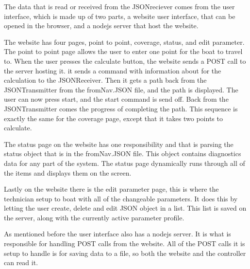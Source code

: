 The data that is read or received from the JSONreciever comes from the user interface, which is made up of two parts, a website user interface, that can be opened in the browser, and a nodejs server that host the website. 

The website has four pages, point to point, coverage, status, and edit parameter. The point to point page allows the user to enter one point for the boat to travel to. When the user presses the calculate button, the website sends a POST call to the server hosting it. it sends a command with information about for the calculation to the JSONReceiver. Then it gets a path back from the JSONTransmitter from the fromNav.JSON file, and the path is displayed. The user can now press start, and the start command is send off. Back from the JSONTransmitter comes the progress of completing the path. This sequence is exactly the same for the coverage page, except that it takes two points to calculate. 

The status page on the website has one responsibility and that is parsing the status object that is in the fromNav.JSON file. This object contains diagnostics data for any part of the system. The status page dynamically runs through all of the items and displays them on the screen.

Lastly on the website there is the edit parameter page, this is where the technician setup to boat with all of the changeable parameters. It does this by letting the user create, delete and edit JSON object in a list. This list is saved on the server, along with the currently active parameter profile. 

As mentioned before the user interface also has a nodejs server\cite{nodejs}. It is what is responsible for handling POST calls from the website. All of the POST calls it is setup to handle is for saving data to a file, so both the website and the controller can read it.



